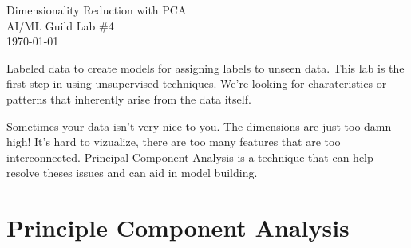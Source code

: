\documentclass[letterpaper,12pt]{article}
\begin{document}
\begin{flushleft}
Dimensionality Reduction with PCA\\
AI/ML Guild Lab \#4\\
\today \\
\end{flushleft}
Labeled data to create models for assigning labels to unseen data. This
lab is the first step in using unsupervised techniques. We're looking for
charateristics or patterns that inherently arise from the data itself.

Sometimes your data isn't very nice to you. The dimensions are just too damn
high! It's hard to vizualize, there are too many features that are too
interconnected. Principal Component Analysis is a technique that can help
resolve theses issues and can aid in model building.

\section{Principle Component Analysis}
\end{document}
